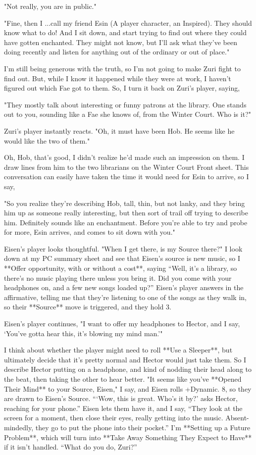 \documentclass[
  oneside,
  statementpaper,
  9pt]{memoir}
\begin{document}
\begin{MC}
"Not really, you are in public."

"Fine, then I ...call my friend Esin (A player character, an Inspired). They should know what to do! And I sit down, and start trying to find out where they could have gotten enchanted. They might not know, but I’ll ask what they’ve been doing recently and listen for anything out of the ordinary or out of place."

I’m still being generous with the truth, so I’m not going to make Zuri fight to find out. But, while I know it happened while they were at work, I haven’t figured out which Fae got to them. So, I turn it back on Zuri’s player, saying,

"They mostly talk about interesting or funny patrons at the library. One stands out to you, sounding like a Fae she knows of, from the Winter Court. Who is it?"

Zuri’s player instantly reacts. "Oh, it must have been Hob. He seems like he would like the two of them."

Oh, Hob, that’s good, I didn’t realize he’d made such an impression on them. I draw lines from him to the two librarians on the Winter Court Front sheet. This conversation can easily have taken the time it would need for Esin to arrive, so I say,

"So you realize they’re describing Hob, tall, thin, but not lanky, and they bring him up as someone really interesting, but then sort of trail off trying to describe him. Definitely sounds like an enchantment. Before you’re able to try and probe for more, Esin arrives, and comes to sit down with you."

Eisen’s player looks thoughtful. "When I get there, is my Source there?" I look down at my PC summary sheet and see that Eisen’s source is new music, so I **Offer opportunity, with or without a cost**, saying “Well, it’s a library, so there’s no music playing there unless you bring it. Did you come with your headphones on, and a few new songs loaded up?” Eisen’s player answers in the affirmative, telling me that they’re listening to one of the songs as they walk in, so their **Source** move is triggered, and they hold 3. 

Eisen’s player continues, "I want to offer my headphones to Hector, and I say, ‘You’ve gotta hear this, it’s blowing my mind man.’"

I think about whether the player might need to roll **Use a Sleeper**, but ultimately decide that it’s pretty normal and Hector would just take them. So I describe Hector putting on a headphone, and kind of nodding their head along to the beat, then taking the other to hear better. "It seems like you’ve **Opened Their Mind** to your Source, Eisen," I say, and Eisen rolls +Dynamic. 8, so they are drawn to Eisen’s Source. “‘Wow, this is great. Who’s it by?’ asks Hector, reaching for your phone.” Eisen lets them have it, and I say, “They look at the screen for a moment, then close their eyes, really getting into the music. Absent-mindedly, they go to put the phone into their pocket.” I’m **Setting up a Future Problem**, which will turn into **Take Away Something They Expect to Have** if it isn’t handled. “What do you do, Zuri?”


\end{MC}
\end{document}
